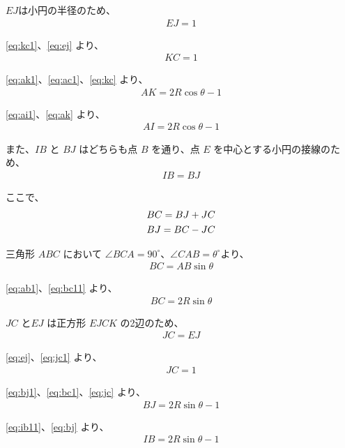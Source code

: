 \documentclass{jsarticle}
\begin{document}
$EJ$は小円の半径のため、
\begin{gather}
  EJ = 1 \label{eq:ej}
\end{gather}

\ref{eq:kc1}、\ref{eq:ej} より、
\begin{gather}
 KC = 1 \label{eq:kc}
\end{gather}

\ref{eq:ak1}、\ref{eq:ac1}、\ref{eq:kc} より、
\begin{gather}
 AK = 2R{\cos}{\theta} - 1 \label{eq:ak}
\end{gather}

\ref{eq:ai1}、\ref{eq:ak} より、
\begin{gather}
 AI = 2R{\cos}{\theta} - 1 \label{eq:ai}
\end{gather}

また、$IB$ と $BJ$ はどちらも点 $B$ を通り、点 $E$ を中心とする小円の接線のため、
\begin{gather}
 IB = BJ \label{eq:ib11}
\end{gather}

ここで、
\begin{gather}
 BC = BJ + JC \notag \\
 BJ = BC - JC \label{eq:bj1}
\end{gather}

三角形 $ABC$ において ${\angle}BCA = 90^{\circ}、{\angle}CAB = {\theta}^{\circ}$より、
\begin{gather}
 BC = AB{\sin}{\theta} \label{eq:bc11}
\end{gather}

\ref{eq:ab1}、\ref{eq:bc11} より、
\begin{gather}
 BC = 2R{\sin}{\theta} \label{eq:bc1}
\end{gather}

$JC$ と$EJ$ は正方形 $EJCK$ の2辺のため、
\begin{gather}
 JC = EJ \label{eq:jc1}
\end{gather}

\ref{eq:ej}、\ref{eq:jc1} より、
\begin{gather}
 JC = 1 \label{eq:jc}
\end{gather}

\ref{eq:bj1}、\ref{eq:bc1}、\ref{eq:jc} より、
\begin{gather}
 BJ = 2R{\sin}{\theta} - 1 \label{eq:bj}
\end{gather}

\ref{eq:ib11}、\ref{eq:bj} より、
\begin{gather}
 IB = 2R{\sin}{\theta} - 1 \label{eq:ib}
\end{gather}
\end{document}
